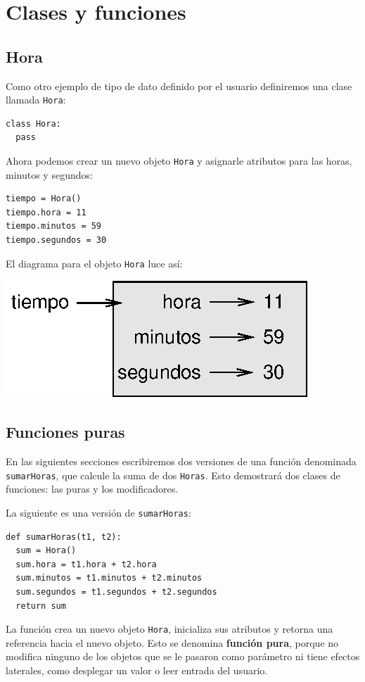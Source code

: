 
\chapter{Clases y funciones}

\label{time}  

\section{Hora}

Como otro ejemplo de tipo de dato definido por el usuario definiremos
una clase llamada \texttt{Hora}:
\begin{lstlisting}
class Hora:
  pass
\end{lstlisting}
Ahora podemos crear un nuevo objeto \texttt{Hora} y asignarle atributos
para las horas, minutos y segundos:
\begin{lstlisting}
tiempo = Hora()
tiempo.hora = 11
tiempo.minutos = 59
tiempo.segundos = 30
\end{lstlisting}
El diagrama para el objeto \texttt{Hora} luce así:

\beforefig \centerline{\includegraphics{illustrations/time}} \afterfig

\section{Funciones puras}

 

En las siguientes secciones escribiremos dos versiones de una función
denominada \texttt{sumarHoras}, que calcule la suma de dos \texttt{Horas}.
Esto demostrará dos clases de funciones: las puras y los modificadores.

La siguiente es una versión de \texttt{sumarHoras}:

\begin{lstlisting}
def sumarHoras(t1, t2):
  sum = Hora()
  sum.hora = t1.hora + t2.hora
  sum.minutos = t1.minutos + t2.minutos
  sum.segundos = t1.segundos + t2.segundos
  return sum
\end{lstlisting}
 La función crea un nuevo objeto \texttt{Hora}, inicializa sus atributos
y retorna una referencia hacia el nuevo objeto. Esto se denomina \textbf{función
pura}, porque no modifica ninguno de los objetos que se le pasaron
como parámetro ni tiene efectos laterales, como desplegar un valor
o leer entrada del usuario.

